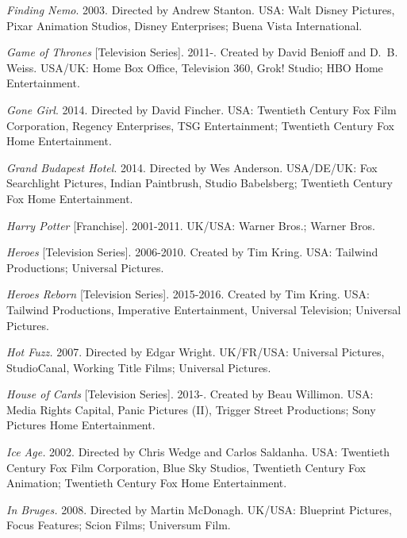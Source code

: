 \medskip\noindent\textit{Finding Nemo}. 2003. Directed by Andrew Stanton. USA: Walt Disney Pictures, Pixar Animation Studios, Disney Enterprises; Buena Vista International.
 
\medskip\noindent\textit{Game of Thrones} [Television Series]. 2011-. Created by David Benioff and D.~B. Weiss. USA/UK: Home Box Office, Television 360, Grok! Studio; HBO Home Entertainment.
 


\medskip\noindent\textit{Gone Girl}. 2014. Directed by David Fincher. USA: Twentieth Century Fox Film Corporation, Regency Enterprises, TSG Entertainment; Twentieth Century Fox Home Entertainment.



\medskip\noindent\textit{Grand Budapest Hotel}. 2014. Directed by Wes Anderson. USA/DE/UK: Fox Searchlight Pictures, Indian Paintbrush, Studio Babelsberg; Twentieth Century Fox Home Entertainment.



\medskip\noindent\textit{Harry Potter} [Franchise]. 2001-2011. UK/USA: Warner Bros.; Warner Bros.



\medskip\noindent\textit{Heroes} [Television Series]. 2006-2010. Created by Tim Kring. USA: Tailwind Productions; Universal Pictures.



\medskip\noindent\textit{Heroes Reborn} [Television Series]. 2015-2016. Created by Tim Kring. USA: Tailwind Productions, Imperative Entertainment, Universal Television; Universal Pictures.



\medskip\noindent\textit{Hot Fuzz.} 2007. Directed by Edgar Wright. UK/FR/USA: Universal Pictures, StudioCanal, Working Title Films; Universal Pictures.



\medskip\noindent\textit{House of Cards} [Television Series]. 2013-. Created by Beau Willimon. USA: Media Rights Capital, Panic Pictures (II), Trigger Street Productions; Sony Pictures Home Entertainment.



\medskip\noindent\textit{Ice Age.} 2002. Directed by Chris Wedge and Carlos Saldanha. USA: Twentieth Century Fox Film Corporation, Blue Sky Studios, Twentieth Century Fox Animation; Twentieth Century Fox Home Entertainment.



\medskip\noindent\textit{In Bruges.} 2008. Directed by Martin McDonagh. UK/USA: Blueprint Pictures, Focus Features; Scion Films; Universum Film.



